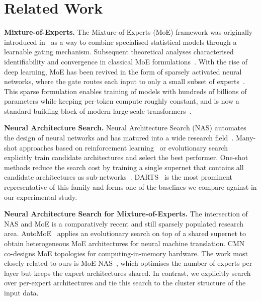 \section{Related Work}
\label{sec:related_work}

\noindent

\vspace{2mm}

\textbf{Mixture-of-Experts.}
The Mixture-of-Experts (MoE) framework was originally introduced
in~\cite{jacobs1991adaptive,jordan1994hierarchical,jacobs1997bayesian}
as a way to combine specialised statistical models through a learnable
gating mechanism. Subsequent theoretical analyses characterised
identifiability and convergence in classical MoE
formulations~\cite{nguyen2023general,nguyen2023demystifying,piwko2025divide,rasmussen2001infinite}.
With the rise of deep learning, MoE has been revived in the form of
sparsely activated neural networks, where the gate routes each input
to only a small subset of
experts~\cite{eigen2013learning,shazeer2017outrageously,riquelme2021scaling,fedus2022switch}.
This sparse formulation enables training of models with hundreds of
billions of parameters while keeping per-token compute roughly
constant, and is now a standard building block of modern large-scale
transformers~\cite{jiang2024mixtral,dai2024deepseekmoe,qiu2025demons}.

\vspace{2mm}

\textbf{Neural Architecture Search.}
Neural Architecture Search (NAS) automates the design of neural
networks and has matured into a wide research
field~\cite{ren2021comprehensive}. Many-shot approaches based on
reinforcement learning~\cite{zoph2016neural,baker2016designing,zoph2018learning}
or evolutionary search~\cite{real2019regularized,yang2020cars}
explicitly train candidate architectures and select the best
performer. One-shot methods reduce the search cost by training a
single supernet that contains all candidate architectures as
sub-networks~\cite{liu2018darts,chen2020stabilizing,you2020greedynas,nayman2019xnas}.
DARTS~\cite{liu2018darts} is the most prominent representative of this
family and forms one of the baselines we compare against in our
experimental study.

\vspace{2mm}

\textbf{Neural Architecture Search for Mixture-of-Experts.}
The intersection of NAS and MoE is a comparatively recent and still
sparsely populated research area. AutoMoE~\cite{jawahar2022automoe}
applies an evolutionary search on top of a shared supernet to obtain
heterogeneous MoE architectures for neural machine translation.
CMN~\cite{han2024cmn} co-designs MoE topologies for
computing-in-memory hardware. The work most closely related to ours
is MoE-NAS~\cite{mecharbat2025moenas}, which optimises the number of
experts per layer but keeps the expert architectures shared. In
contrast, we explicitly search over per-expert architectures and tie
this search to the cluster structure of the input data.

